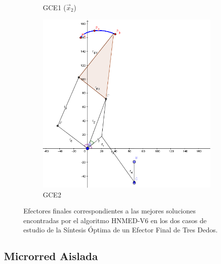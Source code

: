 \begin{figure}
\begin{subfigure}[b]{0.45\linewidth}
	\caption{GCE1  ($\vec{x}_2$)} \label{fig:G1} 
\end{subfigure}
	\begin{subfigure}[b]{0.49\linewidth}
		\includegraphics[width=\textwidth]{Figures/GCE2}
		\caption{GCE2} \label{fig:G2} 
	\end{subfigure}
	\caption{Efectores finales  correspondientes a las mejores soluciones encontradas por el algoritmo HNMED-V6 en los
		dos casos de estudio de la Síntesis Óptima de un Efector Final de Tres Dedos.} \label{fig: Efectores finales  correspondientes a las mejores soluciones encontradas por el algoritmo HNMED-V6 en los dos casos de estudio de la Síntesis Óptima de un Efector Final de Tres Dedos.} 
\end{figure}	

\subsection{Microrred Aislada}

